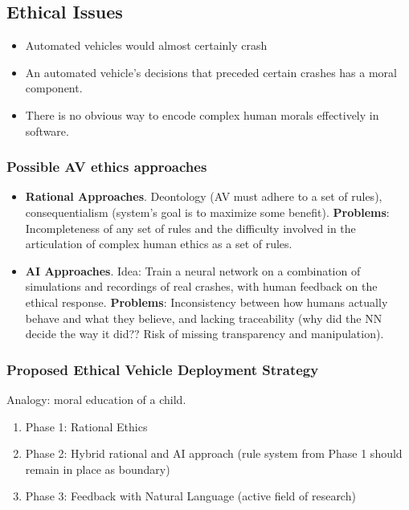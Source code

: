 \documentclass[11pt]{article}
\begin{document}
\subsection{Ethical Issues}
\begin{itemize}
\item Automated vehicles would almost certainly crash
\item An automated vehicle's decisions that preceded certain crashes has a moral component. 
\item There is no obvious way to encode complex human morals effectively in software. 
\end{itemize}
\cite{Goodall2014ethical}

\subsubsection{Possible AV ethics approaches}

\begin{itemize}
\item \textbf{Rational Approaches}. Deontology (AV must adhere to a set of rules), consequentialism (system's goal is to maximize some benefit). \textbf{Problems}: Incompleteness of any set of rules and the difficulty involved in the articulation of complex human ethics as a set of rules.
\item \textbf{AI Approaches}. Idea: Train a neural network on a combination of simulations and recordings of real crashes, with human feedback on the ethical response. \textbf{Problems}: Inconsistency between how humans actually behave and what they believe, and lacking traceability (why did the NN decide the way it did?? Risk of missing transparency and manipulation).
\end{itemize}

\subsubsection{Proposed Ethical Vehicle Deployment Strategy}
Analogy: moral education of a child.
\begin{enumerate}
\item Phase 1: Rational Ethics
\item Phase 2: Hybrid rational and AI approach (rule system from Phase 1 should remain in place as boundary)
\item Phase 3: Feedback with Natural Language (active field of research)
\end{enumerate}
\end{document}
